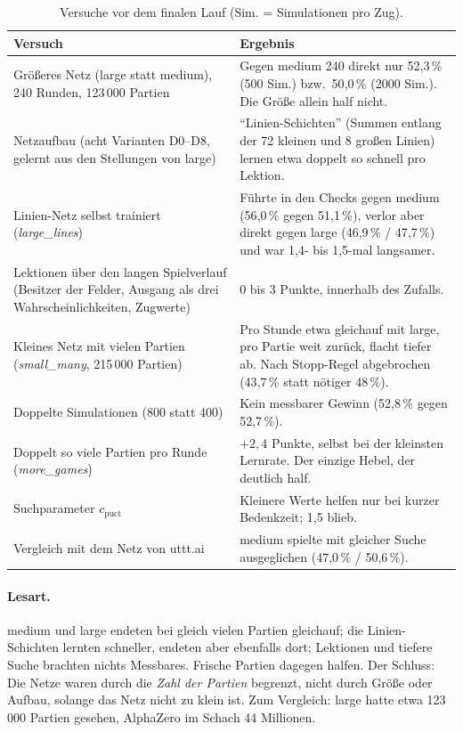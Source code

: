 \documentclass[11pt,a4paper]{article}
\begin{document}
\begin{table}[ht]
\centering
\small
\begin{tabularx}{\textwidth}{>{\raggedright\arraybackslash}p{4.6cm}X}
\toprule
Versuch & Ergebnis \\
\midrule
Größeres Netz (large statt medium), 240 Runden, 123\,000 Partien
 & Gegen medium 240 direkt nur 52{,}3\,\% (500 Sim.) bzw.\ 50{,}0\,\% (2000 Sim.). Die Größe allein half nicht. \\
Netzaufbau (acht Varianten D0--D8, gelernt aus den Stellungen von large)
 & \enquote{Linien-Schichten} (Summen entlang der 72 kleinen und 8 großen Linien) lernen etwa doppelt so schnell pro Lektion. \\
Linien-Netz selbst trainiert (\emph{large\_lines})
 & Führte in den Checks gegen medium (56{,}0\,\% gegen 51{,}1\,\%), verlor aber direkt gegen large (46{,}9\,\% / 47{,}7\,\%) und war 1{,}4- bis 1{,}5-mal langsamer. \\
Lektionen über den langen Spielverlauf (Besitzer der Felder, Ausgang als drei Wahrscheinlichkeiten, Zugwerte)
 & 0 bis 3 Punkte, innerhalb des Zufalls. \\
Kleines Netz mit vielen Partien (\emph{small\_many}, 215\,000 Partien)
 & Pro Stunde etwa gleichauf mit large, pro Partie weit zurück, flacht tiefer ab. Nach Stopp-Regel abgebrochen (43{,}7\,\% statt nötiger 48\,\%). \\
Doppelte Simulationen (800 statt 400)
 & Kein messbarer Gewinn (52{,}8\,\% gegen 52{,}7\,\%). \\
Doppelt so viele Partien pro Runde (\emph{more\_games})
 & $+2{,}4$ Punkte, selbst bei der kleinsten Lernrate. Der einzige Hebel, der deutlich half. \\
Suchparameter $c_\text{puct}$
 & Kleinere Werte helfen nur bei kurzer Bedenkzeit; 1{,}5 blieb. \\
Vergleich mit dem Netz von uttt.ai
 & medium spielte mit gleicher Suche ausgeglichen (47{,}0\,\% / 50{,}6\,\%). \\
\bottomrule
\end{tabularx}
\caption{Versuche vor dem finalen Lauf (Sim. = Simulationen pro Zug).}
\label{tab:versuche}
\end{table}

\paragraph{Lesart.} medium und large endeten bei gleich vielen Partien gleichauf; die Linien-Schichten
lernten schneller, endeten aber ebenfalls dort; Lektionen und tiefere Suche brachten nichts Messbares.
Frische Partien dagegen halfen. Der Schluss: Die Netze waren durch die \emph{Zahl der Partien} begrenzt,
nicht durch Größe oder Aufbau, solange das Netz nicht zu klein ist. Zum Vergleich: large hatte etwa
123\,000 Partien gesehen, AlphaZero im Schach 44 Millionen.
\end{document}
